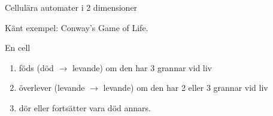 \documentclass{beamer}
\begin{document}
  \begin{frame}{Cellulära automater i 2 dimensioner}

    Känt exempel: Conway's Game of Life.

    En cell

    \begin{enumerate}
      \item föds (död $\rightarrow$ levande) om den har 3 grannar vid liv
      \item överlever (levande $\rightarrow$ levande) om den har 2 eller 3 grannar vid liv
      \item dör eller fortsätter vara död annars.
    \end{enumerate}

  \end{frame}
\end{document}

